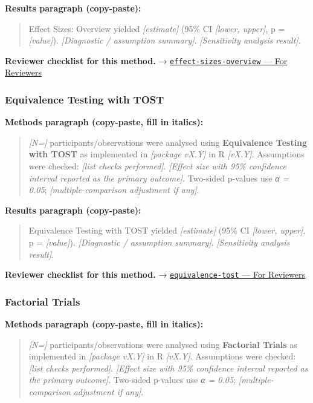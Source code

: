 \documentclass[
]{article}
\begin{document}
\textbf{Results paragraph (copy-paste):}

\begin{quote}
Effect Sizes: Overview yielded \emph{{[}estimate{]}} (95\% CI
\emph{{[}lower, upper{]}}, p = \emph{{[}value{]}}). \emph{{[}Diagnostic
/ assumption summary{]}}. \emph{{[}Sensitivity analysis result{]}}.
\end{quote}

\textbf{Reviewer checklist for this method.} →
\href{../chapters/04-inferential/effect-sizes-overview.Rmd\#for-reviewers}{\texttt{effect-sizes-overview}
--- For Reviewers}

\subsubsection{Equivalence Testing with
TOST}\label{equivalence-testing-with-tost}

\textbf{Methods paragraph (copy-paste, fill in italics):}

\begin{quote}
\emph{{[}N={]}} participants/observations were analysed using
\textbf{Equivalence Testing with TOST} as implemented in
\emph{{[}package vX.Y{]}} in R \emph{{[}vX.Y{]}}. Assumptions were
checked: \emph{{[}list checks performed{]}}. \emph{{[}Effect size with
95\% confidence interval reported as the primary outcome{]}}. Two-sided
p-values use \emph{α = 0.05}; \emph{{[}multiple-comparison adjustment if
any{]}}.
\end{quote}

\textbf{Results paragraph (copy-paste):}

\begin{quote}
Equivalence Testing with TOST yielded \emph{{[}estimate{]}} (95\% CI
\emph{{[}lower, upper{]}}, p = \emph{{[}value{]}}). \emph{{[}Diagnostic
/ assumption summary{]}}. \emph{{[}Sensitivity analysis result{]}}.
\end{quote}

\textbf{Reviewer checklist for this method.} →
\href{../chapters/04-inferential/equivalence-tost.Rmd\#for-reviewers}{\texttt{equivalence-tost}
--- For Reviewers}

\subsubsection{Factorial Trials}\label{factorial-trials}

\textbf{Methods paragraph (copy-paste, fill in italics):}

\begin{quote}
\emph{{[}N={]}} participants/observations were analysed using
\textbf{Factorial Trials} as implemented in \emph{{[}package vX.Y{]}} in
R \emph{{[}vX.Y{]}}. Assumptions were checked: \emph{{[}list checks
performed{]}}. \emph{{[}Effect size with 95\% confidence interval
reported as the primary outcome{]}}. Two-sided p-values use \emph{α =
0.05}; \emph{{[}multiple-comparison adjustment if any{]}}.
\end{quote}
\end{document}
